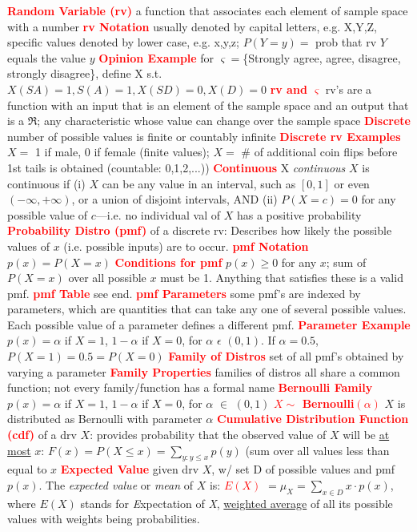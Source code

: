 \documentclass[10pt]{extarticle}
\let\oldtextbf\textbf
\renewcommand{\textbf}[1]{\textcolor{red}{\oldtextbf{#1}}}
\begin{document}
\textbf{Random Variable (rv)} a function that associates each element of sample space with a number
\textbf{rv Notation} usually denoted by capital letters, e.g. X,Y,Z, specific values denoted by lower case, e.g. x,y,z; $P(Y=y)=$ prob that rv $Y$ equals the value $y$
\textbf{Opinion Example} for $\varsigma=$\{Strongly agree, agree, disagree, strongly disagree\}, define X s.t. $X(SA)=1,S(A)=1,X(SD)=0,X(D)=0$
\textbf{rv and $\varsigma$} rv's are a function with an input that is an element of the sample space and an output that is a $\Re$; any characteristic whose value can change over the sample space
\textbf{Discrete} number of possible values is finite or countably infinite
\textbf{Discrete rv Examples} $X=$ 1 if male, 0 if female (finite values); $X=$ \# of additional coin flips before 1st tails is obtained (countable: 0,1,2,...))
\textbf{Continuous} X \emph{continuous} $X$ is continuous if (i) $X$ can be any value in an interval, such as $[0,1]$ or even $(-\infty,+\infty)$, or a union of disjoint intervals, AND (ii) $P(X=c)=0$ for any possible value of $c$---i.e. no individual val of $X$ has a positive probability
\textbf{Probability Distro (pmf)} of a discrete rv: Describes how likely the possible values of $x$ (i.e. possible inputs) are to occur.
\textbf{pmf Notation} $p(x) = P(X=x)$
\textbf{Conditions for pmf} $p(x)\geq 0$ for any $x$; sum of $P(X=x)$ over all possible $x$ must be 1. Anything that satisfies these is a valid pmf.
\textbf{pmf Table} see end.
\textbf{pmf Parameters} some pmf's are indexed by parameters, which are quantities that can take any one of several possible values. Each possible value of a parameter defines a different pmf.
\textbf{Parameter Example} $p(x) = \alpha$ if $X=1$, $1-\alpha$ if $X=0$, for $\alpha$  $\epsilon$ $(0,1)$. If $\alpha=0.5$, $P(X=1)=0.5=P(X=0)$
\textbf{Family of Distros} set of all pmf's obtained by varying a parameter
\textbf{Family Properties} families of distros all share a common function; not every family/function has a formal name
\textbf{Bernoulli Family} $p(x) = \alpha$ if $X=1$, $1-\alpha$ if $X=0$, for $\alpha$  $\in$ $(0,1)$
\textbf{$X\mathtt{\sim}$ Bernoulli$(\alpha)$} $X$ is distributed as Bernoulli with parameter $\alpha$
\textbf{Cumulative Distribution Function (cdf)} of a drv $X$: provides probability that the observed value of $X$ will be \underline{at most} $x$: $F(x) = P(X\leq x) = \sum_{y:y\leq x}p(y)$ (sum over all values less than equal to $x$
\textbf{Expected Value} given drv $X$, w/ set D of possible values and pmf $p(x)$. The \emph{expected value} or \emph{mean} of $X$ is:
\textbf{$E(X)$} $= \mu_{X} = \sum_{x \in D}x\cdot p(x)$, where $E(X)$ stands for \emph{E}xpectation of \emph{X}, \underline{weighted average} of all its possible values with weights being probabilities.
\end{document}
